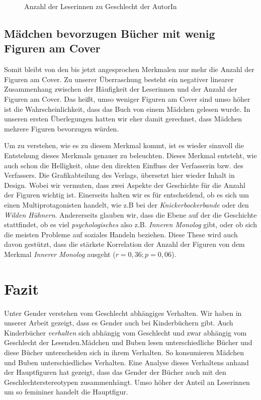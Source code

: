 \begin{figure}
\center
  \caption[Leserinnen--Geschlecht]{Anzahl der Leserinnen zu Geschlecht der AutorIn}
  \label{maedchen-geschlecht}


\end{figure}

\section{Mädchen bevorzugen Bücher mit wenig Figuren am Cover}

Somit bleibt von den bis jetzt angesprochen Merkmalen nur mehr die
Anzahl der Figuren am Cover. Zu unserer Überraschung besteht ein
negativer linearer Zusammenhang zwischen der Häufigkeit der Leserinnen
und der Anzahl der Figuren am Cover. Das heißt, umso weniger Figuren am
Cover sind umso höher ist die Wahrscheinlichkeit, dass das Buch von
einem Mädchen gelesen wurde. In unseren ersten Überlegungen hatten wir
eher damit gerechnet, dass Mädchen mehrere Figuren bevorzugen würden.

Um zu verstehen, wie es zu diesem Merkmal kommt, ist es wieder sinnvoll
die Entstehung dieses Merkmals genauer zu beleuchten. Dieses Merkmal
entsteht, wie auch schon die Helligkeit, ohne den direkten Einfluss der
Verfasserin bzw. des Verfassers. Die Grafikabteilung des Verlags,
übersetzt hier wieder Inhalt in Design. Wobei wir vermuten, dass zwei
Aspekte der Geschichte für die Anzahl der Figuren wichtig ist.
Einerseits halten wir es für entscheidend, ob es sich um einen
Multiprotagonisten handelt, wie z.B bei der \emph{Knickerbockerbande}
oder den \emph{Wilden Hühnern}. Andererseits glauben wir, dass die Ebene
auf der die Geschichte stattfindet, ob es viel \emph{psychologisches}
also z.B. \emph{Inneren Monolog} gibt, oder ob sich die meisten Probleme
auf soziales Handeln beziehen. Diese These wird auch davon gestützt,
dass die stärkste Korrelation der Anzahl der Figuren von dem Merkmal
\emph{Innerer Monolog} ausgeht ($r=0{,}36; p=0{,}06$).

\chapter{Fazit}

Unter Gender verstehen  vom Geschlecht
abhängiges Verhalten. Wir haben in unserer Arbeit gezeigt, dass es
Gender auch bei Kinderbüchern gibt. Auch Kinderbücher \emph{verhalten}
sich abhängig vom Geschlecht und zwar abhängig vom Geschlecht der
Lesenden.Mädchen und Buben lesen unterschiedliche Bücher und diese
Bücher unterscheiden sich in ihrem Verhalten. So konsumieren Mädchen und
Buben unterschiedliches Verhalten. Eine Analyse dieses Verhaltens anhand
der Hauptfiguren hat gezeigt, dass das Gender der Bücher auch mit den
Geschlechterstereotypen zusammenhängt. Umso höher der Anteil an
Leserinnen um so femininer handelt die Hauptfigur.

